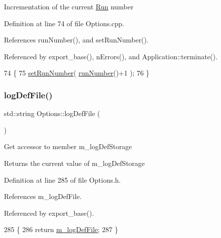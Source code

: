 Incrementation of the current \hyperlink{classRun}{Run} number 

Definition at line 74 of file Options.\+cpp.



References run\+Number(), and set\+Run\+Number().



Referenced by export\+\_\+base(), n\+Errors(), and Application\+::terminate().


\begin{DoxyCode}
74                              \{
75   \hyperlink{classOptions_aed19a55eb2c418f333bc97615cf4a3a8}{setRunNumber}( \hyperlink{classOptions_a2d9447919fe90f9ce8df5530526cbb27}{runNumber}()+1 );
76 \}
\end{DoxyCode}
\mbox{\label{classOptions_a5d362ec7f7969bd72c3c94b8e3d5ba97}} 
\subsubsection{\texorpdfstring{log\+Def\+File()}{logDefFile()}}
{\footnotesize\ttfamily std\+::string Options\+::log\+Def\+File (\begin{DoxyParamCaption}{ }\end{DoxyParamCaption})\hspace{0.3cm}{\ttfamily [inline]}}

Get accessor to member m\+\_\+log\+Def\+Storage \begin{DoxyReturn}{Returns}
the current value of m\+\_\+log\+Def\+Storage 
\end{DoxyReturn}


Definition at line 285 of file Options.\+h.



References m\+\_\+log\+Def\+File.



Referenced by export\+\_\+base().


\begin{DoxyCode}
285                                 \{
286                 \textcolor{keywordflow}{return} \hyperlink{classOptions_abaef6cdcc8422b199084510d173edbe6}{m\_logDefFile};
287         \}
\end{DoxyCode}
\mbox{\label{classOptions_a739a9b788fc937ad55d10d6b47ff1e8c}} 
